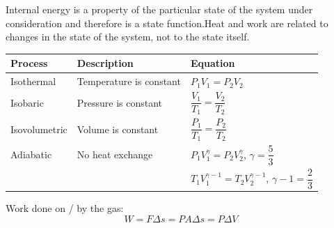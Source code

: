 \documentclass[a4paper,12pt]{article}
\begin{document}
Internal energy is a property of the particular state of the system under consideration and therefore is a state function.Heat and work are related to changes in the state of the
system, not to the state itself.
\begin{center}
\begin{tabularx}{\textwidth}{@{}|Y |Y |Y|@{}}
\toprule
\textbf{Process} & \textbf{Description} & \textbf{Equation} \\
\midrule
Isothermal & Temperature is constant & \(P_1V_1=P_2V_2\) \\\hline
Isobaric & Pressure is constant & \(\dfrac{V_1}{T_1}=\dfrac{V_2}{T_2}\) \\\hline
Isovolumetric & Volume is constant & \(\dfrac{P_1}{T_1}=\dfrac{P_2}{T_2}\) \\\hline
Adiabatic & No heat exchange & \(P_1V_1^{\gamma}=P_2V_2^{\gamma}\), $\gamma=\dfrac{5}{3}$ \\
 & & \(T_1V_1^{\gamma-1}=T_2V_2^{\gamma-1}\), $\gamma-1=\dfrac{2}{3}$\\
\bottomrule
\end{tabularx}
\end{center}
Work done on / by the gas:
\[W=F\Delta s=PA\Delta s=P\Delta V\]
\end{document}
